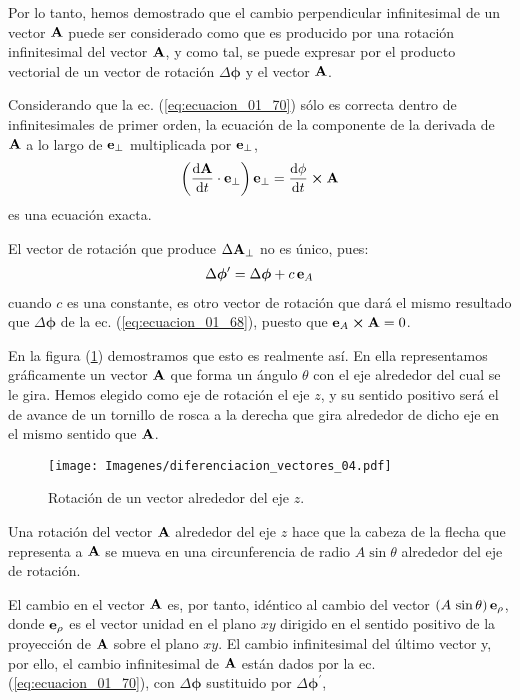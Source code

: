 \documentclass[12pt]{article}
\begin{document}
Por lo tanto, hemos demostrado que el cambio perpendicular infinitesimal de un vector $\vb{A}$ puede ser considerado como que es producido por una rotación infinitesimal del vector $\vb{A}$, y como tal, se puede expresar por el producto vectorial de un vector de rotación $\Delta \bm{\phi}$ y el vector $\vb{A}$. 
\par
Considerando que la ec. (\ref{eq:ecuacion_01_70}) sólo es correcta dentro de infinitesimales de primer orden, la ecuación de la componente de la derivada de $\vb{A}$ a lo largo de $\vb{e}_{\perp}$ multiplicada por $\vb{e}_{\perp}$,
\begin{align}
    \left( \dv{\vb{A}}{t} \cdot \vb{e}_{\perp} \right) \vb{e}_{\perp} = \dv{\phi}{t} \cp \vb{A}
    \label{eq:ecuacion_01_71}
\end{align}
es una ecuación exacta.
\par
El vector de rotación que produce $\Delta \vb{A}_{\perp}$ no es único, pues:
\begin{align*}
    \Delta \bm{\phi}^{\prime} = \Delta \bm{\phi} + c \, \vb{e}_{A} 
\end{align*}
cuando $c$ es una constante, es otro vector de rotación que dará el mismo resultado que $\Delta \bm{\phi}$ de la ec. (\ref{eq:ecuacion_01_68}), puesto que $\vb{e}_{A} \cp \vb{A} = 0$. 
\par
En la figura (\ref{fig:figura_01_22}) demostramos que esto es realmente así. En ella representamos gráficamente un vector $\vb{A}$ que forma un ángulo $\theta$ con el eje alrededor del cual se le gira. Hemos elegido como eje de rotación el eje $z$, y su sentido positivo será el de avance de un tornillo de rosca a la derecha que gira alrededor de dicho eje en el mismo sentido que $\vb{A}$.
\begin{figure}[H]
    \centering
    \texttt{[image: Imagenes/diferenciacion\_vectores\_04.pdf]}
    \caption{Rotación de un vector alrededor del eje $z$.}
    \label{fig:figura_01_22}
\end{figure}
Una rotación del vector $\vb{A}$ alrededor del eje $z$ hace que la cabeza de la flecha que representa a $\vb{A}$ se mueva en una circunferencia de radio $A \sin \theta$ alrededor del eje de rotación.
\par
El cambio en el vector $\vb{A}$ es, por tanto, idéntico al cambio del vector $\left( A \, \sin \theta \right) \vb{e}_{\rho}$, donde $\vb{e}_{\rho}$ es el vector unidad en el plano $x y$ dirigido en el sentido positivo de la proyección de $\vb{A}$ sobre el plano $x y$. El cambio infinitesimal del último vector y, por ello, el cambio infinitesimal de $\vb{A}$ están dados por la ec. (\ref{eq:ecuacion_01_70}), con $\Delta \bm{\phi}$ sustituido por $\Delta \bm{\phi}^{\prime}$,
\end{document}
